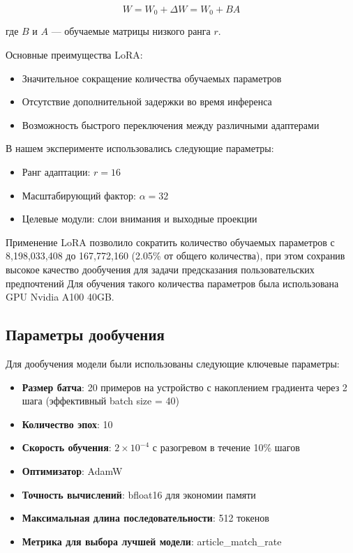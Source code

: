 \begin{equation}
W = W_0 + \Delta W = W_0 + BA
\end{equation}

где $B$ и $A$ — обучаемые матрицы низкого ранга $r$.

Основные преимущества LoRA:
\begin{itemize}
    \item Значительное сокращение количества обучаемых параметров
    \item Отсутствие дополнительной задержки во время инференса
    \item Возможность быстрого переключения между различными адаптерами
\end{itemize}

В нашем эксперименте использовались следующие параметры:
\begin{itemize}
    \item Ранг адаптации: $r = 16$
    \item Масштабирующий фактор: $\alpha = 32$
    \item Целевые модули: слои внимания и выходные проекции
\end{itemize}

Применение LoRA позволило сократить количество обучаемых параметров с 8,198,033,408 до 167,772,160 (2.05\% от общего количества), при этом сохранив высокое качество дообучения для задачи предсказания пользовательских предпочтений
Для обучения такого количества параметров была использована GPU Nvidia A100 40GB.

\subsection*{Параметры дообучения}

Для дообучения модели были использованы следующие ключевые параметры:

\begin{itemize}
    \item \textbf{Размер батча}: 20 примеров на устройство с накоплением градиента через 2 шага (эффективный batch size = 40)
    \item \textbf{Количество эпох}: 10
    \item \textbf{Скорость обучения}: $2 \times 10^{-4}$ с разогревом в течение 10\% шагов
    \item \textbf{Оптимизатор}: AdamW
    \item \textbf{Точность вычислений}: bfloat16 для экономии памяти
    \item \textbf{Максимальная длина последовательности}: 512 токенов
    \item \textbf{Метрика для выбора лучшей модели}: article\_match\_rate
\end{itemize}

